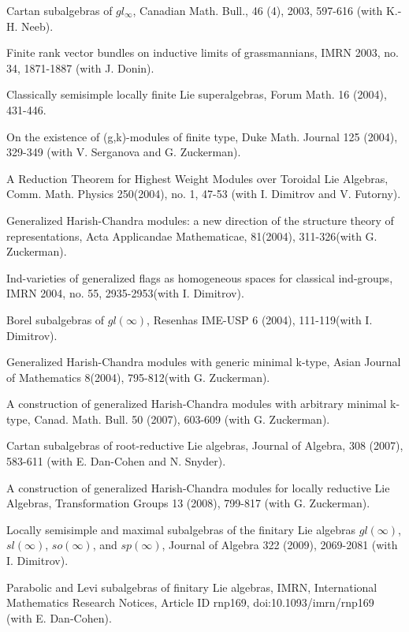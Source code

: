 \documentclass[11pt]{amsart}
\begin{document}
\myss \label{33.} Cartan subalgebras of $gl_{\infty}$, Canadian Math.
Bull., 46 (4), 2003, 597-616 (with K.-H. Neeb).

\myss \label{34.} Finite rank vector bundles on inductive limits of
grassmannians, IMRN 2003, no. 34, 1871-1887  (with J. Donin).

\myss \label{35.} Classically semisimple locally finite Lie
superalgebras, Forum Math. 16 (2004), 431-446.

\myss \label{36.} On the existence of (g,k)-modules of finite
type, Duke Math. Journal 125 (2004), 329-349
(with V. Serganova and G. Zuckerman).

\myss \label{37.} A Reduction Theorem for Highest Weight Modules
over Toroidal Lie Algebras, Comm. Math. Physics 250(2004), no. 1, 47-53 (with I. Dimitrov and V. Futorny).

\myss \label{38.} Generalized Harish-Chandra modules: a new direction of
the structure theory of representations, Acta Applicandae Mathematicae,
81(2004), 311-326(with G. Zuckerman).

\myss \label{39.} Ind-varieties of generalized flags as homogeneous
spaces for classical ind-groups, IMRN 2004, no. 55, 2935-2953(with I. Dimitrov).

\myss \label{40.} Borel subalgebras of $gl(\infty)$, Resenhas IME-USP 6 (2004), 111-119(with I. Dimitrov).

\myss \label{41.} Generalized Harish-Chandra modules with generic minimal k-type,
Asian Journal of Mathematics 8(2004), 795-812(with G. Zuckerman).

\myss \label{42.} A construction of generalized Harish-Chandra modules with arbitrary minimal k-type, Canad. Math. Bull. 50 (2007), 603-609 (with G. Zuckerman). 

\myss \label{43.} Cartan subalgebras of root-reductive Lie algebras, Journal of Algebra, 308 (2007), 583-611 (with E. Dan-Cohen and N. Snyder).

\myss \label{44.} A construction of generalized Harish-Chandra modules for locally reductive Lie Algebras, Transformation Groups 13 (2008), 799-817 (with G. Zuckerman).

\myss \label{45.} Locally semisimple and maximal subalgebras of the finitary Lie algebras $gl(\infty)$, $sl(\infty)$, $so(\infty)$, and $sp(\infty)$, Journal of Algebra 322 (2009), 2069-2081 (with I. Dimitrov).

\myss \label{46.} Parabolic and Levi subalgebras of finitary Lie algebras, IMRN, International Mathematics Research Notices, Article ID rnp169, doi:10.1093/imrn/rnp169 (with E. Dan-Cohen).
\end{document}
